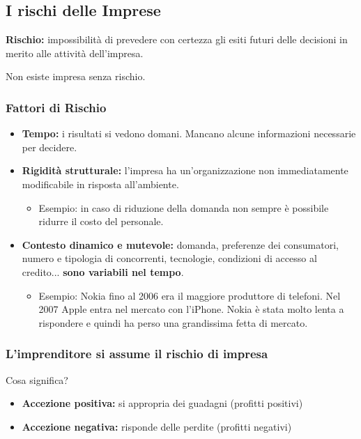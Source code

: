 \documentclass[../main.tex]{subfiles}
\begin{document}
\subsection{I rischi delle Imprese}
		
\textbf{Rischio:} impossibilità di prevedere con certezza gli esiti futuri delle decisioni in merito alle attività dell'impresa.
	
Non esiste impresa senza rischio.

\subsubsection{Fattori di Rischio}

\begin{itemize}
\item
\textbf{Tempo:} i risultati si vedono domani. Mancano alcune informazioni necessarie per decidere.

\item
\textbf{Rigidità strutturale:} l'impresa ha un'organizzazione non immediatamente modificabile in risposta all'ambiente.
	\begin{itemize}
	\item
	Esempio: in caso di riduzione della domanda non sempre è possibile ridurre il costo del personale.
	\end{itemize}

\item
\textbf{Contesto dinamico e mutevole:} domanda, preferenze dei consumatori, numero e tipologia di concorrenti, tecnologie, condizioni di accesso al credito... \textbf{sono variabili nel tempo}.

	\begin{itemize}
	\item
	Esempio: Nokia fino al 2006 era il maggiore produttore di telefoni. Nel 2007 Apple entra nel mercato con l'iPhone. Nokia è stata molto lenta a rispondere e quindi ha perso una grandissima fetta di mercato.
	\end{itemize}

\end{itemize}

\subsubsection{L'imprenditore si assume il rischio di impresa}
Cosa significa?

\begin{itemize}
\item
\textbf{Accezione positiva:} si appropria dei guadagni (profitti positivi)
\item
\textbf{Accezione negativa:} risponde delle perdite (profitti negativi)
\end{itemize}
\end{document}
